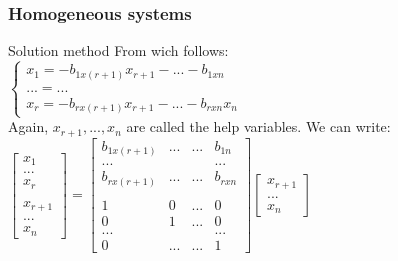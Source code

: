 \begin{frame}
	\frametitle{Homogeneous systems}
	\begin{block}{Solution method}
		From wich follows: \\
		$\begin{cases}
			x_1=-b_{1x(r+1)}x_{r+1}-...-b_{1xn}\\
			...=...\\
			x_r=-b_{rx(r+1)}x_{r+1}-...-b_{rxn}x_n
		\end{cases}$\\
		Again, $x_{r+1},...,x_n$ are called the help variables. We can write:\\
		$\begin{bmatrix}
		x_1\\...\\x_r\\ \\x_{r+1}\\...\\x_n
		\end{bmatrix}=\begin{bmatrix}
		b_{1x(r+1)} & ... & ... & b_{1n}\\
		... &  &  & ...\\
		b_{rx(r+1)} & ... & ...& b_{rxn}\\
		 & & & \\
		1 & 0 & ... & 0 \\
		0 & 1 & ... & 0\\
		... & & & ...\\
		0 & ... & ... & 1
		\end{bmatrix}\begin{bmatrix}
		x_{r+1}\\...\\x_n
		\end{bmatrix}$
	\end{block}
\end{frame}

